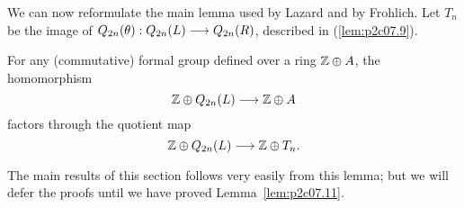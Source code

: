 \documentclass[../main]{subfiles}
\begin{document}
\begin{center}
\end{center}

We can now reformulate the main lemma used by Lazard and by Frohlich. Let $T_n$ be the image of $Q_{2n}(\theta) : Q_{2n}(L) \overset{}{\longrightarrow} Q_{2n}(R)$, described in (\ref{lem:p2c07.9}).

\begin{lemma}
\label{lem:p2c07.11}
For any (commutative) formal group defined over a ring $\mathbb{Z} \oplus A$, the homomorphism $$\mathbb{Z} \oplus Q_{2n}(L) \overset{}{\longrightarrow} \mathbb{Z} \oplus A$$ factors through the quotient map $$\mathbb{Z} \oplus Q_{2n}(L) \overset{}{\longrightarrow} \mathbb{Z} \oplus T_n.$$
\end{lemma}

The main results of this section follows very easily from this lemma; but we will defer the proofs until we have proved Lemma~\ref{lem:p2c07.11}. 
\end{document}
